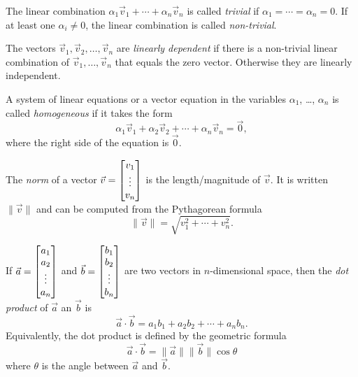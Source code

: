 \begin{SaveDefinition}[
	key=TrivialLinearCombination,
	title={Trivial Linear Combination}]

	The linear combination $\alpha_1\vec v_1+\cdots+\alpha_n\vec v_n$ is called
	\emph{trivial}
	if $\alpha_1=\cdots=\alpha_n=0$. If at least one $\alpha_i\neq 0$,
	the linear combination is called \emph{non-trivial}.
\end{SaveDefinition}

\begin{SaveDefinition}[
	key=LinearlyDependentIndependentAlgebraic,
	title={Linearly Dependent \& Independent (Algebraic)}]

	The vectors $\vec v_{1},\vec v_{2},\ldots,\vec v_{n}$ are
	\emph{linearly dependent} if there is a non-trivial linear combination
	of $\vec v_{1},\ldots,\vec v_{n}$ that equals the zero vector. Otherwise they
	are linearly independent.
\end{SaveDefinition}

\begin{SaveDefinition}[
	key=HomogeneousSystem,
	title={Homogeneous System}]

	A system of linear equations or a vector equation in the variables $\alpha_1$, \ldots, 
	$\alpha_n$ is called
	\emph{homogeneous} if it takes the form
	\[
		\alpha_1\vec v_1+\alpha_2\vec v_2+\cdots +\alpha_n\vec v_n=\vec 0,
	\]
	where the right side of the equation is $\vec 0$.
\end{SaveDefinition}


\begin{SaveDefinition}[key=Norm, title={Norm}]
	The
	\emph{norm} of a vector $\vec v=\begin{bmatrix}v_1\\\vdots\\v_n\end{bmatrix}$ is the length/magnitude
	of $\vec v$. It is written $\|\vec v\|$ and can be computed from the Pythagorean
	formula
	\[
		\|\vec v\|=\sqrt{v_1^2+\cdots +v_n^2}.
	\]

\end{SaveDefinition}

\begin{SaveDefinition}[key=DotProduct, title={Dot Product}]
	If $\vec a=\begin{bmatrix}a_1\\a_2\\ \vdots\\a_n\end{bmatrix}$ and
	$\vec b=\begin{bmatrix}b_1\\b_2\\ \vdots\\b_n\end{bmatrix}$ are two vectors in $n$-dimensional
	space, then the
	\emph{dot product} of $\vec a$ an $\vec b$ is
	\[
		\vec a\cdot\vec b = a_{1}b_{1}+a_{2}b_{2}+\cdots+a_{n}b_{n}.
	\]
	 Equivalently, the dot product is defined by the geometric formula
	\[
		\vec a\cdot \vec b = \|\vec a\|\|\vec b\|\cos \theta
	\]
	 where $\theta$ is the angle between $\vec a$ and $\vec b$.
\end{SaveDefinition}

